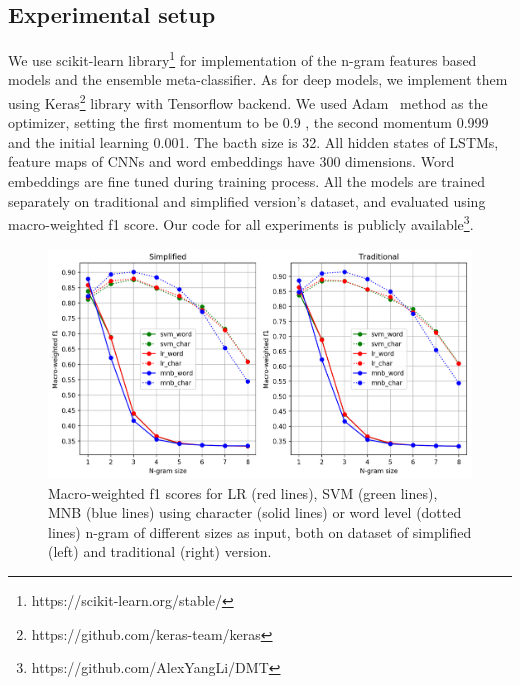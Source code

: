\documentclass[11pt,a4paper]{article}
\begin{document}
\subsection{Experimental setup}
We use scikit-learn library\footnote{https://scikit-learn.org/stable/} for implementation of the n-gram features based models and the ensemble meta-classifier. As for deep models, we implement them using Keras\footnote{https://github.com/keras-team/keras} library with Tensorflow backend. We used Adam~\cite{DBLP:journals/corr/KingmaB14} method as the optimizer, setting the first momentum to be 0.9 , the second momentum 0.999 and the initial learning 0.001. The bacth size is 32. All hidden states of LSTMs, feature maps of CNNs and word embeddings have 300 dimensions. Word embeddings are fine tuned during training process. All  the models are trained separately on traditional and simplified version's dataset, and evaluated using macro-weighted f1 score. Our code for all experiments is publicly available\footnote{https://github.com/AlexYangLi/DMT}. 

\begin{figure}
\centering
\includegraphics[scale=0.6]{single_n_gram_1_2.png}
\caption{Macro-weighted f1 scores for LR (red lines), SVM (green lines), MNB (blue lines) using character (solid lines) or word level (dotted lines) n-gram of different sizes as input, both on dataset of simplified (left) and traditional (right) version.}
\label{single_ngram_p}
\end{figure}
\end{document}
